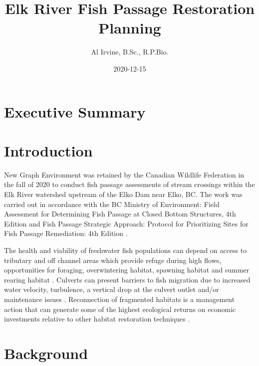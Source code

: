 \documentclass[
]{book}
\title{Elk River Fish Passage Restoration Planning}
\author{Al Irvine, B.Sc., R.P.Bio.}
\date{2020-12-15}
\begin{document}
\maketitle

{
\setcounter{tocdepth}{1}
\tableofcontents
}
\pagebreak

\hypertarget{executive-summary}{%
\chapter*{Executive Summary}\label{executive-summary}}

\hypertarget{intro}{%
\chapter{Introduction}\label{intro}}

New Graph Environment was retained by the Canadian Wildlife Federation in the fall of 2020 to conduct fish passage assessments of stream crossings within the Elk River watershed upstream of the Elko Dam near Elko, BC. The work was carried out in accordance with the BC Ministry of Environment: Field Assessment for Determining Fish Passage at Closed Bottom Structures, 4th Edition \citep{fish_passage_assessments} and Fish Passage Strategic Approach: Protocol for Prioritizing Sites for Fish Passage Remediation: 4th Edition \citep{fishpassagetechnicalworkinggroupFishPassageStrategic2014}.

The health and viability of freshwater fish populations can depend on access to tributary and off channel areas which provide refuge during high flows, opportunities for foraging, overwintering habitat, spawning habitat and summer rearing habitat \citep{Bramblett_2002, swalesRoleOffChannelPonds1989}. Culverts can present barriers to fish migration due to increased water velocity, turbulence, a vertical drop at the culvert outlet and/or maintenance issues \citep{slaneyFishHabitatRehabilitation1997}. Reconnection of fragmented habitats is a management action that can generate some of the highest ecological returns on economic investments relative to other habitat restoration techniques \citep{saldicaromileStreamHabitatRestoration2004}.

\hypertarget{background}{%
\chapter{Background}\label{background}}
\end{document}
